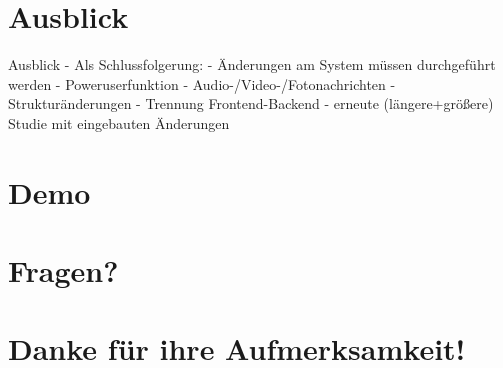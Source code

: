 \documentclass[11pt]{beamer}
\begin{document}
\section{Ausblick}
\begin{frame}{Ausblick}
  - Als Schlussfolgerung:
    - Änderungen am System müssen durchgeführt werden
      - Poweruserfunktion
      - Audio-/Video-/Fotonachrichten
      - Strukturänderungen - Trennung Frontend-Backend
    - erneute (längere+größere) Studie mit eingebauten Änderungen
\end{frame}
\section*{Demo}
\section*{Fragen?}
\section*{Danke für ihre Aufmerksamkeit!}
\end{document}
